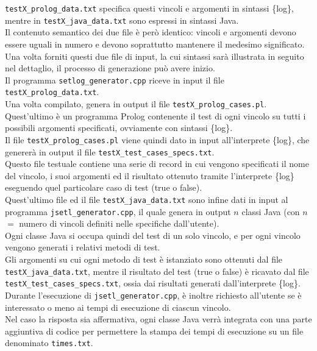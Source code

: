 \documentclass{article}
\begin{document}
\texttt{testX\_prolog\_data.txt} specifica questi vincoli e argomenti in sintassi \{log\}, mentre in \texttt{testX\_java\_data.txt} sono espressi in sintassi Java. \\
Il contenuto semantico dei due file è però identico: vincoli e argomenti devono essere uguali in numero e devono soprattutto mantenere il medesimo significato.\\
Una volta forniti questi due file di input, la cui sintassi sarà illustrata in seguito nel dettaglio, il processo di generazione può avere inizio.\\

Il programma \texttt{setlog\_generator.cpp} riceve in input il file \texttt{testX\_prolog\_data.txt}. \\
Una volta compilato, genera in output il file \texttt{testX\_prolog\_cases.pl}. \\
Quest'ultimo è un programma Prolog contenente il test di ogni vincolo su tutti i possibili argomenti specificati, ovviamente con sintassi \{log\}.\\

Il file \texttt{testX\_prolog\_cases.pl} viene quindi dato in input all'interprete \{log\}, che genererà in output il file \texttt{testX\_test\_cases\_specs.txt}. \\
Questo file testuale contiene una serie di record in cui vengono specificati il nome del vincolo, i suoi argomenti ed il risultato ottenuto tramite l'interprete \{log\} eseguendo quel particolare caso di test (true o false).\\

Quest'ultimo file ed il file \texttt{testX\_java\_data.txt} sono infine dati in input al programma \texttt{jsetl\_generator.cpp}, il quale genera in output $n$ classi Java (con $n$ $=$ numero di vincoli definiti nelle specifiche dall'utente).\\
Ogni classe Java si occupa quindi del test di un solo vincolo, e per ogni vincolo vengono generati i relativi metodi di test.\\
Gli argomenti su cui ogni metodo di test è istanziato sono ottenuti dal file \\ \texttt{testX\_java\_data.txt}, mentre il risultato del test (true o false) è ricavato dal file \texttt{testX\_test\_cases\_specs.txt}, ossia dai risultati generati dall'interprete \{log\}. \\

Durante l'esecuzione di \texttt{jsetl\_generator.cpp}, è inoltre richiesto all'utente se è interessato o meno ai tempi di esecuzione di ciascun vincolo. \\
Nel caso la risposta sia affermativa, ogni classe Java verrà integrata con una parte aggiuntiva di codice per permettere la stampa dei tempi di esecuzione su un file denominato \texttt{times.txt}.\\
\end{document}
